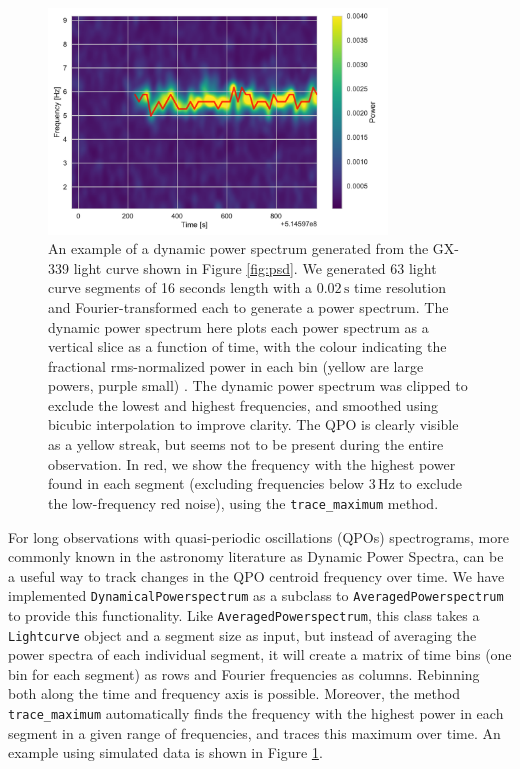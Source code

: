 \documentclass[twocolumn]{aastex62}
\newcommand{\lightcurve}{\texttt{Lightcurve}\xspace}
\begin{document}
\begin{figure}[htbp]
\begin{center}
\includegraphics[width=9cm]{../figures/dyn_spec.pdf}
\caption{An example of a dynamic power spectrum generated from the GX-339 light curve shown in Figure \ref{fig:psd}. We generated 63 light curve segments of 16 seconds length with a $0.02\,\mathrm{s}$ time resolution and Fourier-transformed each to generate a power spectrum. The dynamic power spectrum here plots each power spectrum as a vertical slice as a function of time, with the colour indicating the fractional rms-normalized power in each bin (yellow are large powers, purple small) . The dynamic power spectrum was clipped to exclude the lowest and highest frequencies, and smoothed using bicubic interpolation to improve clarity. The QPO is clearly visible as a yellow streak, but seems not to be present during the entire observation. In red, we show the frequency with the highest power found in each segment (excluding frequencies below $3\,\mathrm{Hz}$ to exclude the low-frequency red noise), using the \texttt{trace_maximum} method.}
\label{fig:dynspec}
\end{center}
\end{figure}

For long observations with quasi-periodic oscillations (QPOs) spectrograms, more commonly known in the astronomy literature as Dynamic Power Spectra, can be a useful way to track changes in the QPO centroid frequency over time. We have implemented \texttt{DynamicalPowerspectrum} as a subclass to \texttt{AveragedPowerspectrum} to provide this functionality. Like \texttt{AveragedPowerspectrum}, this class takes a \lightcurve object and a segment size as input, but instead of averaging the power spectra of each individual segment, it will create a matrix of time bins (one bin for each segment) as rows and Fourier frequencies as columns. Rebinning both along the time and frequency axis is possible. Moreover, the method \texttt{trace_maximum} automatically finds the frequency with the highest power in each segment in a given range of frequencies, and traces this maximum over time. An example using simulated data is shown in Figure \ref{fig:dynspec}.
\end{document}
